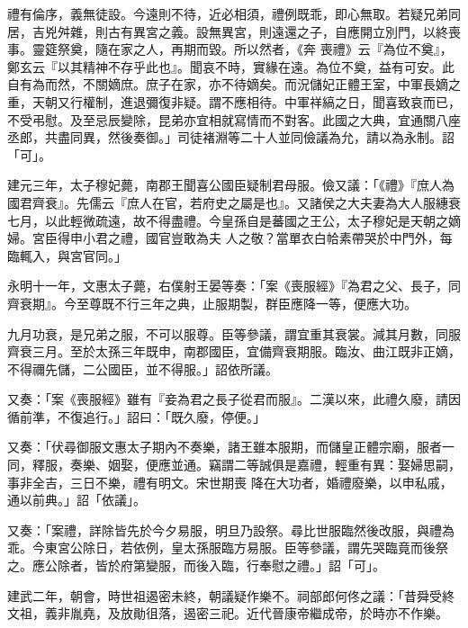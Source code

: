 \begin{pinyinscope}
 禮有倫序，義無徒設。今遠則不待，近必相須，禮例既乖，即心無取。若疑兄弟同居，吉兇舛雜，則古有異宮之義。設無異宮，則遠還之子，自應開立別門，以終喪事。靈筵祭奠，隨在家之人，再期而毀。所以然者，《奔
 喪禮》云『為位不奠』，鄭玄云『以其精神不存乎此也』。聞哀不時，實緣在遠。為位不奠，益有可安。此自有為而然，不關嫡庶。庶子在家，亦不待嫡矣。而況儲妃正體王室，中軍長嫡之重，天朝又行權制，進退彌復非疑。謂不應相待。中軍祥縞之日，聞喜致哀而已，不受弔慰。及至忌辰變除，昆弟亦宜相就寫情而不對客。此國之大典，宜通關八座丞郎，共盡同異，然後奏御。」司徒褚淵等二十人並同儉議為允，請以為永制。詔「可」。



 建元三年，太子穆妃薨，南郡王聞喜公國臣疑制君母服。儉又議：「《禮》『庶人為國君齊衰』。先儒云『庶人在官，若府史之屬是也』。又諸侯之大夫妻為大人服繐衰七月，以此輕微疏遠，故不得盡禮。今皇孫自是蕃國之王公，太子穆妃是天朝之嫡婦。宮臣得申小君之禮，國官豈敢為夫
 人之敬？當單衣白帢素帶哭於中門外，每臨輒入，與宮官同。」



 永明十一年，文惠太子薨，右僕射王晏等奏：「案《喪服經》『為君之父、長子，同齊衰期』。今至尊既不行三年之典，止服期製，群臣應降一等，便應大功。



 九月功衰，是兄弟之服，不可以服尊。臣等參議，謂宜重其衰裳。減其月數，同服齊衰三月。至於太孫三年既申，南郡國臣，宜備齊衰期服。臨汝、曲江既非正嫡，不得禰先儲，二公國臣，並不得服。」詔依所議。



 又奏：「案《喪服經》雖有『妾為君之長子從君而服』。二漢以來，此禮久廢，請因循前準，不復追行。」詔曰：「既久廢，停便。」



 又奏：「伏尋御服文惠太子期內不奏樂，諸王雖本服期，而儲皇正體宗廟，服者一同，釋服，奏樂、姻娶，便應並通。竊謂二等誠俱是嘉禮，輕重有異：娶婦思嗣，事非全吉，三日不樂，禮有明文。宋世期喪
 降在大功者，婚禮廢樂，以申私戚，通以前典。」詔「依議」。



 又奏：「案禮，詳除皆先於今夕易服，明旦乃設祭。尋比世服臨然後改服，與禮為乖。今東宮公除日，若依例，皇太孫服臨方易服。臣等參議，謂先哭臨竟而後祭之。應公除者，皆於府第變服，而後入臨，行奉慰之禮。」詔「可」。



 建武二年，朝會，時世祖遏密未終，朝議疑作樂不。祠部郎何佟之議：「昔舜受終文祖，義非胤堯，及放勛徂落，遏密三祀。近代晉康帝繼成帝，於時亦不作樂。




\end{pinyinscope}
